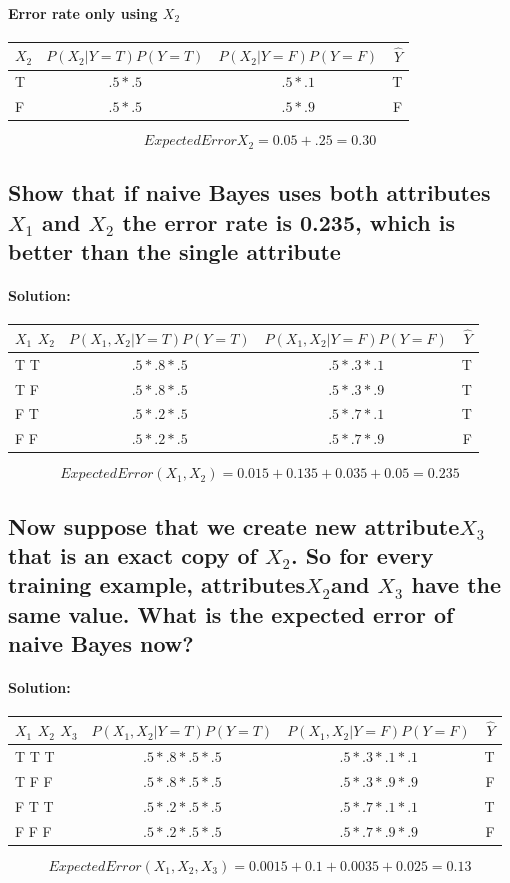 \documentclass{article}
\begin{document}
\paragraph{Error rate only using $X_2$}
\begin{tabular}{l*{2}{c}||r}
$X_2$              & $P(X_2|Y =T)P( Y =T)$&$P(X_2|Y =F)P( Y =F) $ & $\hat{Y}$ \\
\hline
T & $.5 *.5 $& $.5*.1$  & T   \\
F & $.5* .5$ & $.5 *.9$  &  F  \\
\end{tabular}
\linebreak
$$Expected Error X_2 = 0.05 +.25 =0.30 $$ 


\subsection{Show that if naive Bayes uses both attributes $X_1$ and $X_2$ the error rate is 0.235, which is better than the single attribute}
\paragraph{Solution:}
\begin{tabular}{l*{2}{c}||r}
$X_1$ $X_2$             & $P(X_1, X_2|Y =T)P( Y =T)$&$P(X_1, X_2|Y =F)P( Y =F) $ & $\hat{Y}$ \\
\hline
T T & $.5 *.8* .5$ & $.5*.3*.1 $  &  T \\
T F & $.5* .8* .5$ & $.5 *.3*.9$  &  T  \\
F T & $.5* .2* .5$ & $.5 *.7*.1$  &  T  \\
F F & $.5* .2* .5$ & $.5 *.7*.9$  &  F   \\
\end{tabular}
\linebreak
$$Expected Error( X_1, X_2)  = 0.015 +0.135 +0.035+ 0.05 =0.235 $$ 

\subsection{Now suppose that we create new attribute$ X_3$ that is an exact copy of $X_2$. So for every training example, attributes$ X_2 $and $X_3$ have the same value. What is the expected error of naive Bayes now?}
\paragraph{Solution:}
\begin{tabular}{l*{2}{c}||r}
$X_1$ $X_2$ $X_3$   & $P(X_1, X_2|Y =T)P( Y =T)$&$P(X_1, X_2|Y =F)P( Y =F) $ & $\hat{Y}$ \\
\hline
T T T & $.5 *.8*.5 *.5$ & $.5*.3*.1*.1 $   &  T \\
T F F & $.5* .8* .5 *.5$ & $.5 *.3*.9*.9$  &  F  \\
F T T & $.5* .2* .5 *.5$ & $.5 *.7*.1*.1$  &  T  \\
F F F & $.5* .2* .5 *.5$ & $.5 *.7*.9*.9$  &  F   \\
\end{tabular}
\linebreak
$$Expected Error( X_1, X_2,X_3)  = 0.0015 +0.1 +0.0035+ 0.025 =0.13 $$
\end{document}
